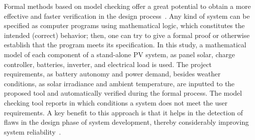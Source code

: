\documentclass[review]{elsarticle}
\begin{document}
Formal methods based on model checking offer a great potential to obtain a more effective and faster verification in the design process~\citep{ClarkeHV18}.  
Any kind of system can be specified as computer programs using mathematical logic, which constitutes the intended (correct) behavior; then, one can try to give a formal proof or otherwise establish that the program meets its specification. %
%
%
%
%
In this study, a mathematical model of each component of a stand-alone PV system, as panel solar, charge controller, batteries, inverter, and electrical load is used. %
The project requirements, as battery autonomy and power demand, besides weather conditions, as solar irradiance and ambient temperature, are inputted to the proposed tool and automatically verified during the formal process. The model checking tool reports in which conditions a system does not meet the user requirements. A key benefit to this approach is that it helps in the detection of flaws in the design phase of system development, thereby considerably improving system reliability~\citep{Akram2018}. 
\end{document}
